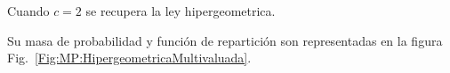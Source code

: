 Cuando $c = 2$ se recupera la ley hipergeometrica.

Su masa  de probabilidad  y funci\'on de  repartici\'on son representadas  en la
figura Fig.~\ref{Fig:MP:HipergeometricaMultivaluada}.
%
\begin{figure}[h!]
%
\label{Fig:MP:HipergeometricaMultivariada}
\end{figure}





